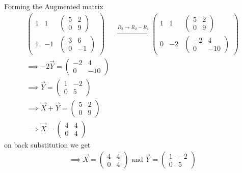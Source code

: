 \documentclass[journal]{IEEEtran}
\begin{document}
Forming the Augmented matrix
\begin{align}
\left(\begin{array}{cc|c}
1 & 1 & \begin{pmatrix} 5 & 2 \\ 0 & 9 \end{pmatrix} \\
1 & -1 & \begin{pmatrix} 3 & 6 \\ 0 & -1 \end{pmatrix}
\end{array}\right)  &\xrightarrow{R_2 \rightarrow R_2-R_1} \left(\begin{array}{cc|c}
1 & 1 & \begin{pmatrix} 5 & 2 \\ 0 & 9 \end{pmatrix} \\
0 & -2 & \begin{pmatrix} -2 & 4 \\ 0 & -10 \end{pmatrix}
\end{array}\right)\\
\implies -2\Vec{Y}=\begin{pmatrix} -2 & 4 \\ 0 & -10 \end{pmatrix}\\
\implies \Vec{Y}=\begin{pmatrix} 1 & -2 \\ 0 & 5 \end{pmatrix}\\
\implies \Vec{X}+\Vec{Y}=\begin{pmatrix} 5 & 2 \\ 0 & 9 \end{pmatrix}\\
\implies \Vec{X}=\begin{pmatrix} 4 & 4 \\ 0 & 4 \end{pmatrix}
\end{align}
on back substitution we get
\begin{align}
    \implies \Vec{X}=\begin{pmatrix} 4 & 4 \\ 0 & 4 \end{pmatrix} \text{ and }
    \Vec{Y}=\begin{pmatrix} 1 & -2 \\ 0 & 5 \end{pmatrix}
\end{align}
\end{document}
